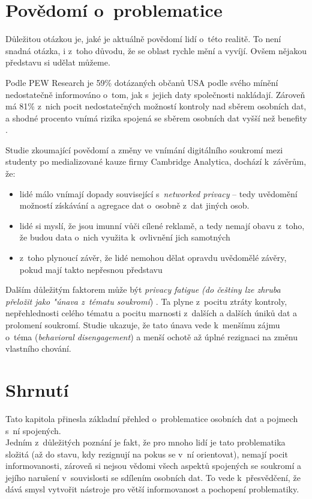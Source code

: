 \section{Povědomí o~problematice}

Důležitou otázkou je, jaké je aktuálně povědomí lidí o~této realitě. To není snadná otázka, i z~toho důvodu, že se oblast rychle mění a vyvíjí. Ovšem nějakou představu si udělat můžeme.

Podle PEW Research je 59\% dotázaných občanů USA podle svého mínění nedostatečně informováno o~tom, jak s~jejich daty společnosti nakládají.
Zároveň má 81\% z~nich pocit nedostatečných možností kontroly nad sběrem osobních dat, a shodné procento vnímá rizika spojená se sběrem osobních dat vyšší než benefity \citep{lack-of-control}.

Studie \citep{privacy-awareness} zkoumající povědomí a změny ve vnímání digitálního soukromí mezi studenty po medializované kauze firmy Cambridge Analytica, dochází k~závěrům, že:

\begin{itemize}
	\item lidé málo vnímají dopady související s~\textit{networked privacy} -- tedy uvědomění možností získávání a agregace dat o~osobně z~dat jiných osob.
	\item lidé si myslí, že jsou imunní vůči cílené reklamě, a tedy nemají obavu z~toho, že budou data o~nich využita k~ovlivnění jich samotných
	\item z~toho plynoucí závěr, že lidé nemohou dělat opravdu uvědomělé závěry, pokud mají takto nepřesnou představu
\end{itemize}

Dalším důležitým faktorem může být \textit{privacy fatigue (do češtiny lze zhruba přeložit jako "únava z~tématu soukromí}) \citep{privacy-fatigue}. Ta plyne z~pocitu ztráty kontroly, nepřehlednosti celého tématu a pocitu marnosti z~dalších a dalších úniků dat a prolomení soukromí. Studie ukazuje, že tato únava vede k~menšímu zájmu o~téma (\textit{behavioral disengagement}) a menší ochotě až úplné rezignaci na změnu vlastního chování.

\section*{Shrnutí}
Tato kapitola přinesla základní přehled o~problematice osobních dat a pojmech s~ní spojených.\\
Jedním z~důležitých poznání je fakt, že pro mnoho lidí je tato problematika složitá (až do stavu, kdy rezignují na pokus se v~ní orientovat), nemají pocit informovanosti, zároveň si nejsou vědomi všech aspektů spojených se soukromí a jejího narušení v~souvislosti se sdílením osobních dat. To vede k~přesvědčení, že dává smysl vytvořit nástroje pro větší informovanost a pochopení problematiky.